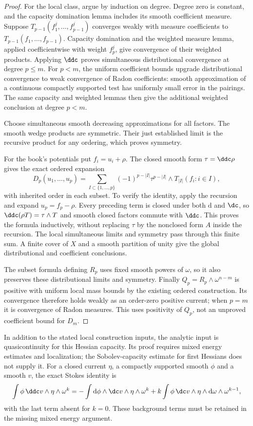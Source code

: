 \begin{proof}
For the local class, argue by induction on degree. Degree zero is
constant, and the capacity domination lemma includes its smooth
coefficient measure. Suppose $T_{p-1}(f_1^j,\ldots,f_{p-1}^j)$
converges weakly with measure coefficients to
$T_{p-1}(f_1,\ldots,f_{p-1})$. Capacity domination and the weighted
measure lemma, applied coefficientwise with weight $f_p^j$, give
convergence of their weighted products. Applying $\ddc$ proves
simultaneous distributional convergence at degree $p\leq m$.
For $p<m$, the uniform coefficient bounds upgrade distributional
convergence to weak convergence of Radon coefficients: smooth
approximation of a continuous compactly supported test has uniformly
small error in the pairings. The same capacity and weighted lemmas
then give the additional weighted conclusion at degree $p<m$.

Choose simultaneous smooth decreasing approximations for all factors.
The smooth wedge products are symmetric. Their just established limit
is the recursive product for any ordering, which proves symmetry.

For the book's potentials put $f_i=u_i+\rho$. The closed smooth form
$\tau=\ddc\rho$ gives the exact ordered expansion
\[
 D_p(u_1,\ldots,u_p)
 =\sum_{I\subset\{1,\ldots,p\}}
       (-1)^{p-|I|}\tau^{p-|I|}\wedge T_{|I|}(f_i:i\in I),
\]
with inherited order in each subset. To verify the identity, apply the
recursion and expand $u_p=f_p-\rho$. Every preceding term is closed
under both $\mathrm d$ and $\dc$, so
$\ddc(\rho T)=\tau\wedge T$ and smooth closed factors commute with
$\ddc$. This proves the formula inductively, without replacing
$\tau$ by the nonclosed form $A$ inside the recursion.
The local simultaneous limits and symmetry pass through this finite
sum. A finite cover of $X$ and a smooth partition of unity give the
global distributional and coefficient conclusions.

The subset formula defining $R_p$ uses fixed smooth powers of
$\omega$, so it also preserves these distributional limits and
symmetry. Finally $Q_p=R_p\wedge\omega^{n-m}$ is positive with uniform
local mass bounds by the existing ordered construction. Its
convergence therefore holds weakly as an order-zero positive current;
when $p=m$ it is convergence of Radon measures. This uses positivity
of $Q_p$, not an unproved coefficient bound for $D_m$.
\end{proof}

In addition to the stated local construction inputs, the analytic
input is quasicontinuity for this Hessian capacity. Its proof requires
mixed energy estimates and localization;
the Sobolev-capacity estimate for first Hessians does not supply it.
For a closed current $\eta$, a compactly supported smooth $\phi$ and
a smooth $v$, the exact Stokes identity is
\[
 \int\phi\,\ddc v\wedge\eta\wedge\omega^k
 =-\int\mathrm d\phi\wedge\dc v\wedge\eta\wedge\omega^k
   +k\int\phi\,\dc v\wedge\eta\wedge\mathrm d\omega
                                              \wedge\omega^{k-1},
\]
with the last term absent for $k=0$. These background terms must be
retained in the missing mixed energy argument.
